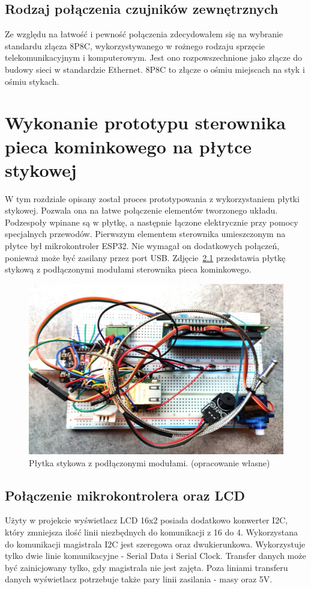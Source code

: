 \documentclass[11pt]{report}
\begin{document}
 \section{Rodzaj połączenia czujników zewnętrznych}
 Ze względu na łatwość i pewność połączenia zdecydowałem się na wybranie standardu złącza 8P8C, wykorzystywanego w rożnego rodzaju sprzęcie telekomunikacyjnym i komputerowym. Jest ono rozpowszechnione jako złącze do budowy sieci w standardzie Ethernet. 8P8C to złącze o ośmiu miejscach na styk i ośmiu stykach.
 
 
 \chapter{Wykonanie prototypu sterownika pieca kominkowego na płytce stykowej}\label{ch:prototyp:stykowa}
 W tym rozdziale opisany został proces prototypowania z wykorzystaniem płytki stykowej.
 Pozwala ona na łatwe połączenie elementów tworzonego układu. Podzespoły wpinane są w płytkę, a następnie łączone elektrycznie przy pomocy specjalnych przewodów.
 Pierwszym elementem sterownika umieszczonym na płytce był mikrokontroler ESP32. Nie wymagał on dodatkowych połączeń, ponieważ może być zasilany przez port USB.
    Zdjęcie~\ref{fig:stykowa} przedstawia płytkę stykową z podłączonymi modułami sterownika pieca kominkowego.
    \begin{figure}[ht]
\centering
\includegraphics[width=0.8 \textwidth]{fig/plytka_stykowa.jpg}
\caption{Płytka stykowa z podłączonymi modułami. (opracowanie własne)}
\label{fig:stykowa}
\end{figure}
  
 \section{Połączenie mikrokontrolera oraz LCD}
 Użyty w projekcie wyświetlacz LCD 16x2 posiada dodatkowo konwerter I2C, który zmniejsza ilość linii niezbędnych do komunikacji z 16 do 4. Wykorzystana do komunikacji magistrala I2C jest szeregowa oraz dwukierunkowa. Wykorzystuje tylko dwie linie komunikacyjne - Serial Data i Serial Clock. Transfer danych może być zainicjowany tylko, gdy magistrala nie jest zajęta. Poza liniami transferu danych wyświetlacz potrzebuje także pary linii zasilania - masy oraz 5V.
  
\end{document}
